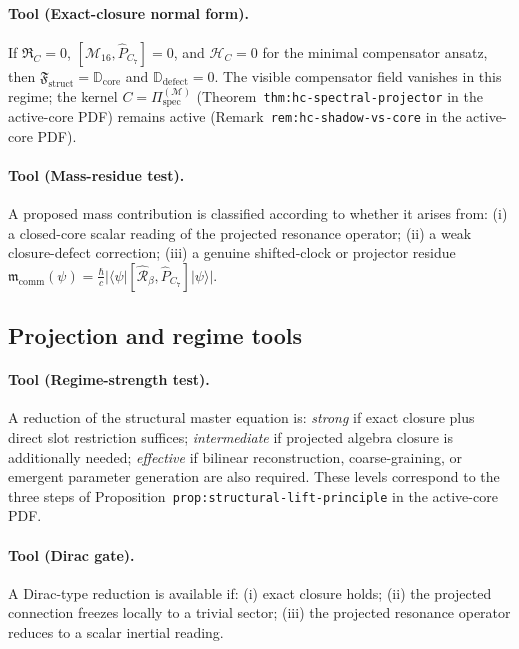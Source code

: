 \paragraph{Tool (Exact-closure normal form).}
If $\mathfrak{R}_C = 0$, $[\mathcal{M}_{16},\hat{P}_{C_7}] = 0$, and
$\mathcal{H}_C = 0$ for the minimal compensator ansatz, then
$\mathfrak{F}_{\mathrm{struct}} = \mathbb{D}_{\mathrm{core}}$ and
$\mathbb{D}_{\mathrm{defect}} = 0$.
The visible compensator field vanishes in this regime; the kernel
$C = \Pi^{(\mathcal{M})}_{\mathrm{spec}}$
(Theorem~\texttt{thm:hc-spectral-projector} in the active-core PDF) remains active
(Remark~\texttt{rem:hc-shadow-vs-core} in the active-core PDF).

\paragraph{Tool (Mass-residue test).}
A proposed mass contribution is classified according to whether it
arises from: (i) a closed-core scalar reading of the projected resonance
operator; (ii) a weak closure-defect correction; (iii) a genuine
shifted-clock or projector residue
$\mathfrak{m}_{\mathrm{comm}}(\psi)
= \frac{\hbar}{c}|\langle\psi|[\hat{\mathcal{R}}_\beta,\hat{P}_{C_7}]|\psi\rangle|$.

\subsection*{Projection and regime tools}

\paragraph{Tool (Regime-strength test).}
A reduction of the structural master equation is: \emph{strong} if
exact closure plus direct slot restriction suffices; \emph{intermediate}
if projected algebra closure is additionally needed; \emph{effective} if
bilinear reconstruction, coarse-graining, or emergent parameter
generation are also required.
These levels correspond to the three steps of
Proposition~\texttt{prop:structural-lift-principle} in the active-core PDF.

\paragraph{Tool (Dirac gate).}
A Dirac-type reduction is available if: (i) exact closure holds;
(ii) the projected connection freezes locally to a trivial sector;
(iii) the projected resonance operator reduces to a scalar inertial
reading.

